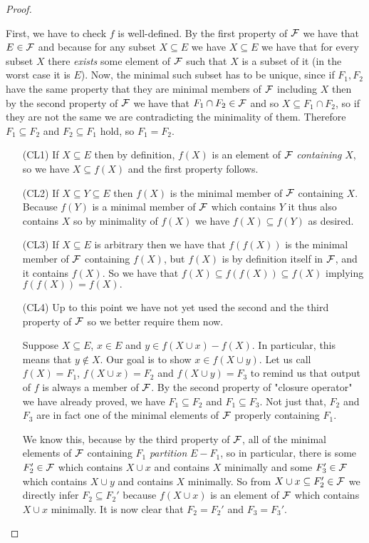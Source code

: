\begin{proof}
\begin{enumerate}
    First, we have to check $f$ is well-defined. By the first property of $\mathcal{F}$ we have that $E \in \mathcal{F}$ and because for any subset $X \subseteq E$ we have $X \subseteq E$ we have that for every subset $X$ there \textit{exists} some element of $\mathcal{F}$ such that $X$ is a subset of it (in the worst case it is $E$). Now, the minimal such subset has to be unique, since if $F_1, F_2$ have the same property that they are minimal members of $\mathcal{F}$ including $X$ then by the second property of $\mathcal{F}$ we have that $F_1 \cap F_2 \in \mathcal{F}$ and so $X \subseteq F_1\cap F_2$, so if they are not the same we are contradicting the minimality of them. Therefore $ F_1 \subseteq F_2$ and $F_2 \subseteq F_1$ hold, so $F_1 = F_2.$


\begin{enumerate}
    \item[(CL1)] If $X \subseteq E$ then by definition, $f(X)$ is an element of $\mathcal{F}$ \textit{containing} $X$, so we have $X \subseteq f(X)$ and the first property follows.
    
    \item[(CL2)] If $X \subseteq Y \subseteq E$ then $f(X)$ is the minimal member of $\mathcal{F}$ containing $X$. Because $f(Y)$ is a minimal member of $\mathcal{F}$ which contains $Y$ it thus also contains $X$ so by minimality of $f(X)$ we have $f(X)\subseteq f(Y)$ as desired.

    \item[(CL3)] If $X \subseteq E$ is arbitrary then we have that $f(f(X))$ is the minimal member of $\mathcal{F}$ containing $f(X)$, but $f(X)$ is by definition itself in $\mathcal{F}$, and it contains $f(X)$. So we have that $f(X) \subseteq f(f(X)) \subseteq f(X)$ implying $f(f(X)) = f(X).$

    \item[(CL4)] Up to this point we have not yet used the second and the third property of $\mathcal{F}$ so we better require them now.

     Suppose $X \subseteq E$, $x \in E$ and $y \in f(X \cup x) - f(X)$. In particular, this means that $y \notin X$.
   Our goal is to show $x \in f(X \cup y)$. Let us call $f(X) = F_1$, $f(X \cup x) = F_2$ and $f(X \cup y) = F_3$ to remind us that output of $f$ is always a member of $\mathcal{F}$. By the second property of "closure operator" we have already proved, we have $F_1 \subseteq F_2$ and $F_1 \subseteq F_3$. Not just that, $F_2$ and $F_3$ are in fact one of the minimal elements of $\mathcal{F}$ properly containing $F_1$.

     We know this, because by the third property of $\mathcal{F}$, all of the minimal elements of $\mathcal{F}$ containing $F_1$ \textit{partition} $E-F_1$, so in particular, there is some $F_2' \in \mathcal{F}$ which contains $X\cup x$ and contains $X$ minimally and some $F_3' \in \mathcal{F}$ which contains $X \cup y$ and contains $X$ minimally. So from $X \cup x \subseteq F_2' \in \mathcal{F}$ we directly infer $F_2 \subseteq F_2'$ because $f(X \cup x)$ is an element of $\mathcal{F}$ which contains $X \cup x$ minimally. It is now clear that $F_2= F_2'$ and $F_3 = F_3'$.



\end{enumerate}
\end{enumerate}
\end{proof}
